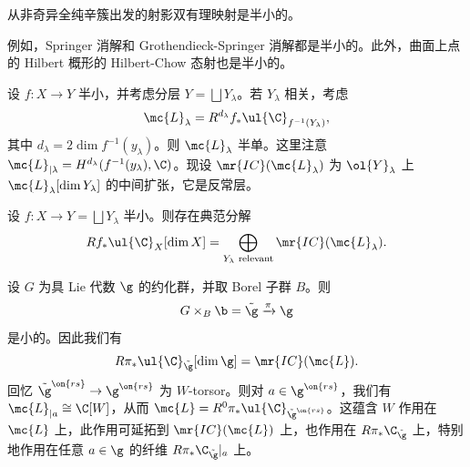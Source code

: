 \begin{thm}
    从非奇异全纯辛簇出发的射影双有理映射是半小的。
\end{thm}

\begin{exm}
    例如，Springer 消解和 Grothendieck-Springer 消解都是半小的。此外，曲面上点的 Hilbert 概形的 Hilbert-Chow 态射也是半小的。
\end{exm}

设 \(f \colon X \to Y\) 半小，并考虑分层 \(Y = \bigsqcup Y_{\lambda}\)。若 \(Y_{\lambda}\) 相关，考虑
\[ \mc{L}_{\lambda} = R^{d_{\lambda}} f_* \ul{\C}_{f^{-1}(Y_{\lambda})}, \]
其中 \(d_{\lambda} = 2 \dim f^{-1} (y_{\lambda})\)。则 \(\mc{L}_{\lambda}\) 半单。这里注意 \(\mc{L}_{|\lambda} = H^{d_{\lambda}}(f^{-1}(y_{\lambda}), \C)\)。现设 \(\mr{IC}(\mc{L}_{\lambda})\) 为 \(\ol{Y}_{\lambda}\) 上 \(\mc{L}_{\lambda}[\dim Y_{\lambda}]\) 的中间扩张，它是反常层。

\begin{thm}
    设 \(f \colon X \to Y = \bigsqcup Y_{\lambda}\) 半小。则存在典范分解
    \[ R f_* \ul{\C}_X[\dim X] = \bigoplus_{Y_{\lambda}\text{ relevant}} \mr{IC}(\mc{L}_{\lambda}). \]
\end{thm}

\begin{exm}
    设 \(G\) 为具 Lie 代数 \(\g\) 的约化群，并取 Borel 子群 \(B\)。则
    \[ G \times_B \b = \tilde{\g} \xrightarrow{\pi} \g \]
    是小的。因此我们有
    \[ R \pi_* \ul{\C}_{\tilde{\g}} [\dim \g] = \mr{IC}(\mc{L}). \]
    回忆 \(\tilde{\g}^{\on{rs}} \to \g^{\on{rs}}\) 为 \(W\)-torsor。则对 \(a \in \g^{\on{rs}}\)，我们有 \(\mc{L}_{|a} \cong \C[W]\)，从而 \(\mc{L} = R^0 \pi_* \ul{\C}_{\tilde{\g}^{\on{rs}}}\)。这蕴含 \(W\) 作用在 \(\mc{L}\) 上，此作用可延拓到 \(\mr{IC}(\mc{L})\) 上，也作用在 \(R \pi_* \C_{\tilde{\g}}\) 上，特别地作用在任意 \(a \in \g\) 的纤维 \(R \pi_* \C_{\tilde{\g}}|_a\) 上。
\end{exm}

